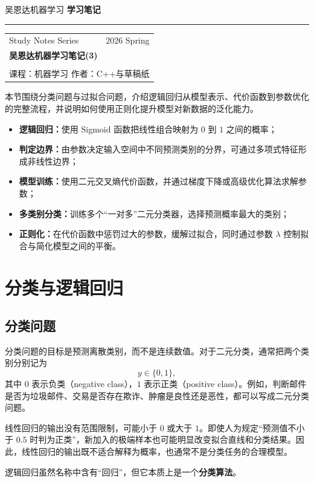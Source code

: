 \documentclass[12pt,a4paper]{ctexart}
\newcommand{\topbar}[2]{
  \noindent
  {\small\textcolor{MainColor}{#1}}
  \hfill
  {\small\bfseries\textcolor{TitleDark}{#2}}
  \par\vspace{0.35em}
  {\color{BorderGray}\hrule}
  \vspace{1.2em}
}
\newcommand{\notetitlecard}[6]{
\begin{tcolorbox}[
  enhanced,
  colback=white,
  colframe=BorderGray,
  boxrule=0.6pt,
  arc=2mm,
  left=12pt,
  right=12pt,
  top=10pt,
  bottom=10pt,
  borderline west={4pt}{0pt}{SecondColor}
]
\begin{tabularx}{\linewidth}{X r}
{\small\textcolor{TextGray}{#1}} & {\small\textcolor{TextGray}{#2}} \\[0.9em]
\multicolumn{2}{l}{
  {\Huge\bfseries\textcolor{MainColor}{#3}}
} \\[0.45em]
\multicolumn{2}{l}{
  {\large\textcolor{SecondColor!90!black}{#4}}
} \\[0.45em]
\multicolumn{2}{l}{
  {\small\textcolor{TextGray}{课程：#5 \qquad 作者：#6}}
}
\end{tabularx}
\end{tcolorbox}
\vspace{1em}
}
\newcommand{\important}[1]{\textbf{\textcolor{MainColor}{#1}}}
\begin{document}
\topbar{吴恩达机器学习}{学习笔记}

\notetitlecard
  {Study Notes Series}
  {2026 Spring}
  {吴恩达机器学习笔记(3)}
  {}
  {机器学习}
  {C++与草稿纸}

\begin{summarybox}
本节围绕分类问题与过拟合问题，介绍逻辑回归从模型表示、代价函数到参数优化的完整流程，并说明如何使用正则化提升模型对新数据的泛化能力。
\begin{itemize}[leftmargin=2em, itemsep=2pt, topsep=4pt]
  \item \textbf{逻辑回归：}使用 Sigmoid 函数把线性组合映射为 $0$ 到 $1$ 之间的概率；
  \item \textbf{判定边界：}由参数决定输入空间中不同预测类别的分界，可通过多项式特征形成非线性边界；
  \item \textbf{模型训练：}使用二元交叉熵代价函数，并通过梯度下降或高级优化算法求解参数；
  \item \textbf{多类别分类：}训练多个“一对多”二元分类器，选择预测概率最大的类别；
  \item \textbf{正则化：}在代价函数中惩罚过大的参数，缓解过拟合，同时通过参数 $\lambda$ 控制拟合与简化模型之间的平衡。
\end{itemize}
\end{summarybox}

\section{分类与逻辑回归}

\subsection{分类问题}

\begin{definitionbox}[二元分类]
分类问题的目标是预测离散类别，而不是连续数值。对于二元分类，通常把两个类别分别记为
\[
  y\in\{0,1\},
\]
其中 $0$ 表示负类（negative class），$1$ 表示正类（positive class）。例如，判断邮件是否为垃圾邮件、交易是否存在欺诈、肿瘤是良性还是恶性，都可以写成二元分类问题。
\end{definitionbox}

\begin{mistakebox}[为什么不直接使用线性回归分类]
线性回归的输出没有范围限制，可能小于 $0$ 或大于 $1$。即使人为规定“预测值不小于 $0.5$ 时判为正类”，新加入的极端样本也可能明显改变拟合直线和分类结果。因此，线性回归的输出既不适合解释为概率，也通常不是分类任务的合理模型。

逻辑回归虽然名称中含有“回归”，但它本质上是一个\important{分类算法}。
\end{mistakebox}
\end{document}
